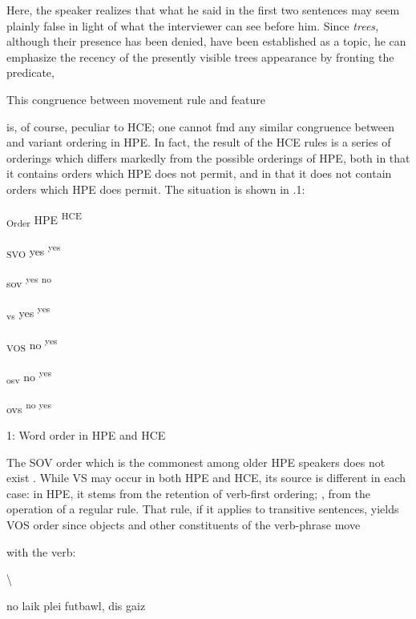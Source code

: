 Here, the speaker realizes that what he said in the first two sentences may seem plainly false in light of what the interviewer can see before him. Since \textit{trees,} although their presence has been denied, have been established as a topic, he can emphasize the recency of the presently visible trees appearance by fronting the predicate,

This congruence between movement rule and  feature

is, of course, peculiar to HCE; one cannot fmd any similar congruence between  and variant ordering in HPE. In fact, the result of the HCE rules is a series of orderings which differs markedly from the possible orderings of HPE, both in that it contains orders which HPE does not permit, and in that it does not contain orders which HPE does permit. The situation is shown in .1:

\textsubscript{Order }HPE \textsuperscript{HCE}

\textsubscript{SVO }yes \textsuperscript{yes}

sov \textsuperscript{yes no}

\textsubscript{vs }yes \textsuperscript{yes}

\textsubscript{VOS }no \textsuperscript{yes}

\textsubscript{osv }no \textsuperscript{yes}

ovs \textsuperscript{no yes}

\begin{table}
\caption{1: Word order in HPE and HCE}
\label{tab:1}
\end{table}

The SOV order which is the commonest among older  HPE speakers does not exist . While VS may occur in both HPE and HCE, its source is different in each case: in HPE, it stems from the retention of verb-first ordering; , from the operation of a regular rule. That rule, if it applies to transitive sentences, yields VOS order  since objects and other constituents of the verb-phrase move

with the verb:

{\textbackslash}


\ea\label{ex:27}
 no laik plei futbawl, dis gaiz
\glt
\z

